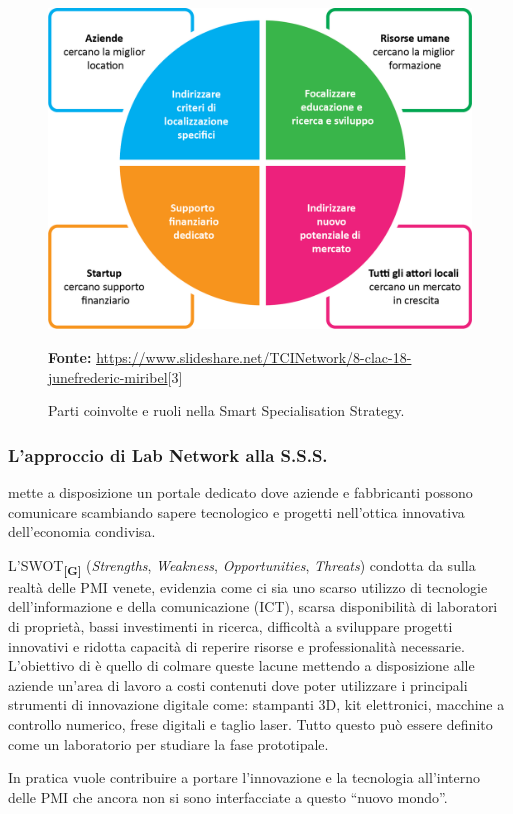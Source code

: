 \begin{figure}[H]
	\begin{center}
	\includegraphics[scale=0.37]{immagini/sss_graph.png}
	\caption{Parti coinvolte e ruoli nella Smart Specialisation Strategy.}
	\small{\textbf{Fonte:} \url{https://www.slideshare.net/TCINetwork/8-clac-18-junefrederic-miribel}[3]}	
	\end{center}
\end{figure}
\subsubsection{L'approccio di Lab Network alla S.S.S.}
\lab{} mette a disposizione un portale dedicato dove aziende e fabbricanti possono comunicare scambiando sapere tecnologico e progetti nell'ottica innovativa dell'economia condivisa.

L'\gls{SWOT}\textbf{\textsubscript{[G]}} (\textit{Strengths}, \textit{Weakness}, \textit{Opportunities}, \textit{Threats}) condotta da \lab{} sulla realtà delle PMI venete, evidenzia come ci sia uno scarso utilizzo di tecnologie dell'informazione e della comunicazione (ICT), scarsa disponibilità di laboratori di proprietà, bassi investimenti in ricerca, difficoltà a sviluppare progetti innovativi e ridotta capacità di reperire risorse e professionalità necessarie. 
L'obiettivo di \lab{} è quello di colmare queste lacune mettendo a disposizione alle aziende un'area di lavoro a costi contenuti dove poter utilizzare i principali strumenti di innovazione digitale come: stampanti 3D, kit elettronici, macchine a controllo numerico, frese digitali e taglio laser. Tutto questo può essere definito come un laboratorio per studiare la fase prototipale.

In pratica \lab{} vuole contribuire a portare l'innovazione e la tecnologia all'interno delle PMI che ancora non si sono interfacciate a questo ``nuovo mondo''.
\newpage